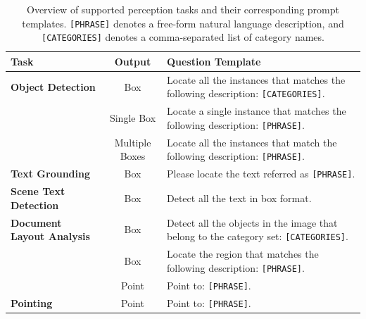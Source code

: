 \documentclass{llmxive}
\providecommand{\arraystretch}{1.2}
\providecommand{\tabularxcolumn}[1]{m{#1}}
\begin{document}

\begin{table}[!htbp]
\centering
\vspace{+2mm}
\renewcommand{\arraystretch}{1.3}
\setlength{\tabcolsep}{6pt}
\small

\renewcommand{\tabularxcolumn}[1]{m{#1}}
\begin{tabularx}{\linewidth}{>{\arraybackslash}m{3.2cm} c >{\arraybackslash}X}
\arrayrulecolor{nvgreen}
\toprule
\rowcolor{nvheader}
\textbf{Task} & \textbf{Output} & \textbf{Question Template} \\
\midrule

\rowcolor{nvlightgreen}
\textbf{Object Detection} & Box & Locate all the instances that matches the following description:  \texttt{[CATEGORIES]}. \\
\midrule\noalign{\vspace{3pt}}

\rowcolor{nvwhite}
 & Single Box & Locate a single instance that matches the following description: \texttt{[PHRASE]}. \\

\rowcolor{nvwhite}
\multirow{-2}{3.2cm}{\textbf{Phrase Grounding}} & Multiple Boxes & Locate all the instances that match the following description: \texttt{[PHRASE]}. \\
\midrule

\rowcolor{nvlightgreen}
\textbf{Text Grounding} & Box & Please locate the text referred as \texttt{[PHRASE]}. \\
\midrule

\rowcolor{nvwhite}
\textbf{Scene Text Detection} & Box & Detect all the text in box format. \\
\midrule

\rowcolor{nvlightgreen}
\textbf{Document Layout Analysis} & Box & Detect all the objects in the image that belong to the category set: \texttt{[CATEGORIES]}. \\
\midrule\noalign{\vspace{3pt}}

\rowcolor{nvwhite}
 & Box & Locate the region that matches the following description: \texttt{[PHRASE]}. \\
\rowcolor{nvwhite}
\multirow{-2}{3.2cm}{\textbf{GUI Grounding}} & Point & Point to: \texttt{[PHRASE]}. \\
\midrule

\rowcolor{nvlightgreen}
\textbf{Pointing} & Point & Point to: \texttt{[PHRASE]}. \\
\bottomrule

\end{tabularx}
\caption{Overview of supported perception tasks and their corresponding prompt templates. \texttt{[PHRASE]} denotes a free-form natural language description, and \texttt{[CATEGORIES]} denotes a comma-separated list of category names.}
\label{tab:task_prompts}
\end{table}
\end{document}
